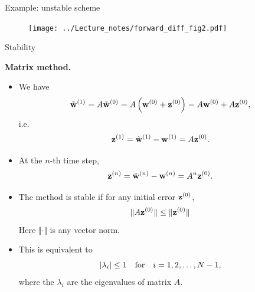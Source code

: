 \documentclass{beamer}
\begin{document}
\begin{frame}{Example: unstable scheme}
\begin{figure}[h]
\centering
\texttt{[image: ../Lecture\_notes/forward\_diff\_fig2.pdf]}
\end{figure}


\end{frame}

\begin{frame}{Stability}

{\small

\textbf{Matrix method.}

\begin{itemize}

\item We have
\[
\tilde{\bf w}^{(1)}=A\tilde{\bf w}^{(0)}=A\left({\bf w}^{(0)}+{\bf z}^{(0)}\right)=A{\bf w}^{(0)}+A{\bf z}^{(0)},
\]
i.e.
\[
{\bf z}^{(1)}=\tilde{\bf w}^{(1)}-{\bf w}^{(1)}=A{\bf z}^{(0)}.
\]
\item At the $n$-th time step,
\[
{\bf z}^{(n)}=\tilde{\bf w}^{(n)}-{\bf w}^{(n)}=A^n{\bf z}^{(0)}.
\]
\item The method is stable if
for any initial error ${\bf z}^{(0)}$,
\[
\Vert A{\bf z}^{(0)}\Vert\leq \Vert {\bf z}^{(0)}\Vert
\]
Here $\Vert\cdot\Vert$ is any vector norm.

\item This is
equivalent to
\[
\vert\lambda_{i}\vert\leq 1 \quad \hbox{for} \quad i=1, 2, \dots, N-1,
\]
where the $\lambda_i$ are the eigenvalues of matrix $A$.

\end{itemize}
}

\end{frame}

\end{document}
